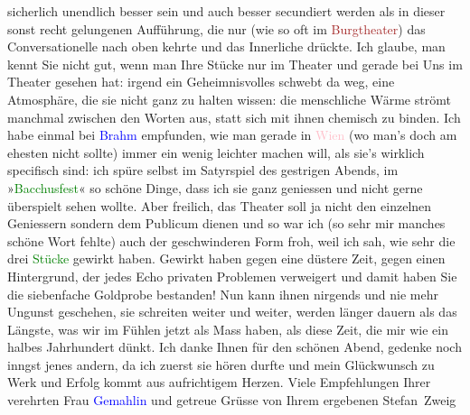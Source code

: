                sicherlich unendlich besser sein und auch besser secundiert werden als in dieser
               sonst recht gelungenen Aufführung, die nur (wie so oft im \textcolor{brown}{Burgtheater}{}\ledrightnote{\textcolor{brown}{Burgtheater}}) das Conversationelle nach oben kehrte und das
               Innerliche drückte. Ich glaube, man kennt Sie nicht gut, wenn man Ihre Stücke nur im
               Theater und gerade bei Uns im Theater gesehen hat: irgend ein \strikeout{\textcolor{gray}{Fond}} Geheimnisvolles schwebt da weg,
               eine Atmosphäre, die sie nicht ganz zu {\pb}halten wissen: die menschliche Wärme strömt manchmal zwischen den Worten aus, statt
               sich mit ihnen chemisch zu binden. Ich habe einmal bei \textcolor{blue}{Brahm}{}\ledrightnote{\textcolor{blue}{Otto Brahm}} empfunden, wie man gerade in \textcolor{pink}{Wien}{}\ledrightnote{\textcolor{pink}{Wien}} (wo man’s doch am ehesten \introOben{}nicht\introOben{}
               sollte) immer ein wenig leichter machen will, als sie's wirklich specifisch sind: ich
               spüre selbst im Satyrspiel des gestrigen Abends, im »\textcolor{green}{Bacchusfest}{}\ledrightnote{\textcolor{green}{Das Bacchusfest}}« so schöne Dinge, dass ich sie ganz geniessen und nicht gerne
               überspielt sehen wollte. Aber freilich, das Theater soll ja nicht den einzelnen
               Geniessern sondern dem Publicum dienen und so war ich (so sehr mir manches schöne
               Wort fehlte) auch der geschwinderen Form froh, weil ich sah, wie sehr die drei \textcolor{green}{Stücke}{}\ledrightnote{\textcolor{green}{Komödie der Worte. Drei Einakter}} gewirkt haben. Gewirkt haben gegen eine
               düstere Zeit, gegen einen Hintergrund, der jedes Echo privaten Problemen verweigert
               und damit \introOben{}haben Sie\introOben{} die siebenfache Goldprobe {\pb}bestanden! Nun
               kann ihnen nirgends und nie mehr Ungunst geschehen, sie schreiten weiter und weiter,
               werden länger dauern als das Längste, was wir im Fühlen jetzt als Mass haben, als
               diese Zeit, die mir wie ein halbes Jahrhundert dünkt. Ich danke Ihnen für den schönen
               Abend, gedenke noch inngst jenes andern, da ich zuerst sie hören durfte und mein
               Glückwunsch zu Werk und Erfolg kommt aus aufrichtigem Herzen. Viele Empfehlungen
               Ihrer verehrten Frau \textcolor{blue}{Gemahlin}{}\ledrightnote{{$\rightarrow$}\textcolor{blue}{Olga Schnitzler}}
               und getreue Grüsse von Ihrem ergebenen\pend
           \pstart \spacefill\mbox{Stefan Zweig}\pend{}\endnumbering{}
\begin{anhang}
\end{anhang}
      